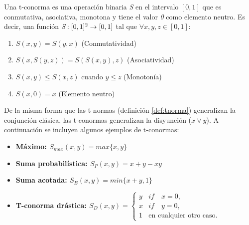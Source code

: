 \begin{definition}
Una t-conorma es una operación binaria \emph{S} en el intervalo $[0,1]$ que es conmutativa, asociativa, monotona y tiene el valor \emph{0} como elemento neutro. Es decir, una función $\emph{S} : [0,1]^2 \rightarrow [0,1]$ tal que $\forall x,y,z \in [0,1]$:
\begin{enumerate}[label=(S\arabic*),ref=(S\arabic*)]
   \item $S(x,y) = S(y,x)$ (Conmutatividad)\label{S1}
   \item $S(x,S(y,z)) = S(S(x,y),z)$ (Asociatividad)\label{S2}
   \item $S(x,y) \leq S(x,z)$ cuando $y \leq z$ (Monotonía)\label{S3}
   \item $S(x,0) = x$ (Elemento neutro)\label{S4}
  \end{enumerate}
\end{definition}
De la misma forma que las t-normas (definición \ref{def:tnorma}) generalizan la conjunción clásica, las t-conormas generalizan la disyunción ($x\vee y$). A continuación se incluyen algunos ejemplos de t-conormas:
\begin{itemize}
	\item \bfseries Máximo: $S_{max}(x,y) = max\{x,y\}$
	\item \bfseries Suma probabilística: $S_{P}(x,y) = x + y - xy$
	\item \bfseries Suma acotada: $S_{B}(x,y) = min\{x+y,1\}$
	\item \bfseries T-conorma drástica: \mdseries $S_{D}(x,y) = \begin{cases} y & if\quad x=0, \\ x & if\quad y=0, \\1 & \text{en cualquier otro caso}. \end{cases}$
\end{itemize}
